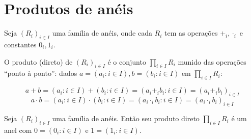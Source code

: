 \chapter{Produtos de anéis}


\begin{definition}
    Seja $(R_i)_{i \in I}$ uma família de anéis, onde cada $R_i$ tem as operações $+_i, \cdot_i$ e constantes $0_i, 1_i$.
    
    O produto (direto) de $(R_i)_{i \in I}$ é o conjunto $\prod_{i \in I} R_i$ munido das operações ``ponto à ponto'': dados $a=(a_i: i \in I), b=(b_i: i \in I)$ em $\prod_{i \in I}R_i$:

    $$a+b=(a_i: i \in I)+(b_i: i \in I)=(a_i+_i b_i: i \in I)=(a_i+_ib_i)_{i \in I}$$
    $$a\cdot b=(a_i: i \in I)\cdot (b_i: i \in I)=(a_i\cdot _i b_i: i \in I)=(a_i\cdot _ib_i)_{i \in I}$$

\end{definition}

\begin{lemma}
    Seja $(R_i)_{i \in I}$ uma família de anéis. Então seu produto direto $\prod_{i \in I}R_i$ é um anel com $0=(0_i: i \in I)$ e $1=(1_i: i \in I)$.
\end{lemma}

